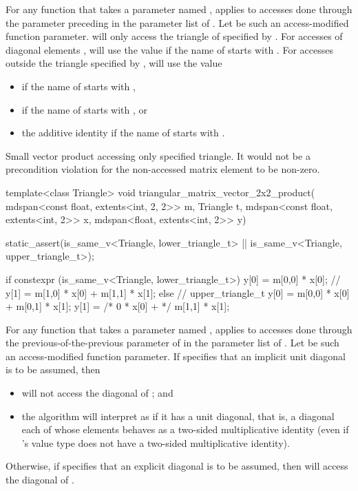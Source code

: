 \pnum
For any function  that takes
a parameter named ,
 applies to accesses done through the parameter preceding  in the parameter list of .
Let  be such an access-modified function parameter.
 will only access the triangle of  specified by .
For accesses of diagonal elements ,
 will use the value 
if the name of  starts with .
For accesses  outside the triangle specified by ,
 will use the value
\begin{itemize}
\item
{} if the name of  starts with ,
\item
{} if the name of  starts with , or
\item
the additive identity if the name of  starts with .
\end{itemize}
\begin{example}
Small vector product accessing only specified triangle.
It would not be a precondition violation for the non-accessed
matrix element to be non-zero.
\begin{codeblock}
template<class Triangle>
void triangular_matrix_vector_2x2_product(
       mdspan<const float, extents<int, 2, 2>> m,
       Triangle t,
       mdspan<const float, extents<int, 2>> x,
       mdspan<float, extents<int, 2>> y) {

  static_assert(is_same_v<Triangle, lower_triangle_t> ||
                is_same_v<Triangle, upper_triangle_t>);

  if constexpr (is_same_v<Triangle, lower_triangle_t>) {
    y[0] = m[0,0] * x[0];       // 
    y[1] = m[1,0] * x[0] + m[1,1] * x[1];
  } else {                      // upper_triangle_t
    y[0] = m[0,0] * x[0] + m[0,1] * x[1];
    y[1] = /* 0 * x[0] + */ m[1,1] * x[1];
  }
}
\end{codeblock}
\end{example}

\pnum
For any function  that takes a parameter named ,
 applies to accesses done through
the previous-of-the-previous parameter of 
in the parameter list of .
Let  be such an access-modified function parameter.
If  specifies that an implicit unit diagonal is to be assumed, then
\begin{itemize}
\item
{} will not access the diagonal of ; and
\item
the algorithm will interpret  as if it has a unit diagonal, that is,
a diagonal each of whose elements behaves as a two-sided multiplicative identity
(even if 's value type does not have
a two-sided multiplicative identity).
\end{itemize}
Otherwise,
if  specifies that an explicit diagonal is to be assumed,
then  will access the diagonal of .

